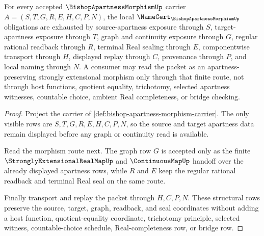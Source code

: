 \begin{theorem}
\label{thm:bishop-apartness-morphism-namecert-obligations}
For every accepted $\BishopApartnessMorphismUp$ carrier $A=(S,T,G,R,E,H,C,P,N)$, the local $\NameCert_{\BishopApartnessMorphismUp}$ obligations are exhausted by source-apartness exposure through $S$, target-apartness exposure through $T$, graph and continuity exposure through $G$, regular rational readback through $R$, terminal Real sealing through $E$, componentwise transport through $H$, displayed replay through $C$, provenance through $P$, and local naming through $N$. A consumer may read the packet as an apartness-preserving strongly extensional morphism only through that finite route, not through host functions, quotient equality, trichotomy, selected apartness witnesses, countable choice, ambient Real completeness, or bridge checking.
\end{theorem}
\begin{proof}
Project the carrier of \autoref{def:bishop-apartness-morphism-carrier}. The only visible rows are $S,T,G,R,E,H,C,P,N$, so the source and target apartness data remain displayed before any graph or continuity read is available.

Read the morphism route next. The graph row $G$ is accepted only as the finite $\StronglyExtensionalRealMapUp$ and $\ContinuousMapUp$ handoff over the already displayed apartness rows, while $R$ and $E$ keep the regular rational readback and terminal Real seal on the same route.

Finally transport and replay the packet through $H,C,P,N$. These structural rows preserve the source, target, graph, readback, and seal coordinates without adding a host function, quotient-equality coordinate, trichotomy principle, selected witness, countable-choice schedule, Real-completeness row, or bridge row.
\end{proof}



